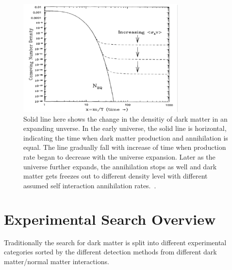 \begin{figure}[!htb]
    \begin{center}
        \includegraphics[width=0.75\textwidth]{figures/chapter_DM/WIMP}
        \caption{
		Solid line here shows the change in the densitiy of dark matter in an expanding unverse. In the early universe, the solid line is horizontal, indicating the time when dark matter production and annihilation is equal. The line gradually fall with increase of time when production rate began to decrease with the universe expansion. Later as the universe further expands, the annihilation stops as well and dark matter gets freezes out to different density level with different assumed self interaction annihilation rates.~\cite{WIMP}.
        }
        \label{fig:WIMP_figure}
    \end{center}
\end{figure}


 



\section{Experimental Search Overview}
\label{section:searches}

Traditionally the search for dark matter is split into different experimental categories sorted by the different detection methods from different dark matter/normal matter interactions. 

